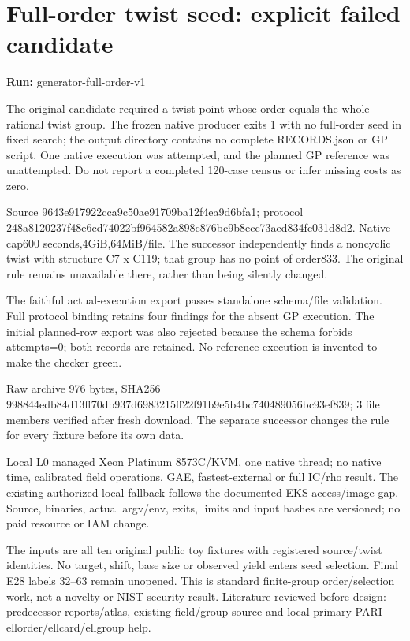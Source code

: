 \documentclass[10pt]{article}
\begin{document}
\section*{Full-order twist seed: explicit failed candidate}
\textbf{Run:} generator-full-order-v1\par
The original candidate required a twist point whose order equals the whole rational twist group. The frozen native producer exits 1 with no full-order seed in fixed search; the output directory contains no complete RECORDS.json or GP script. One native execution was attempted, and the planned GP reference was unattempted. Do not report a completed 120-case census or infer missing costs as zero.

Source 9643e917\allowbreak{}922cca9c\allowbreak{}50ae9170\allowbreak{}9ba12f4e\allowbreak{}a9d6bfa1; protocol 248a8120\allowbreak{}237f48e6\allowbreak{}cd74022b\allowbreak{}f964582a\allowbreak{}898c876b\allowbreak{}c9b8ecc7\allowbreak{}3aed834f\allowbreak{}c031d8d2. Native cap600 seconds,4GiB,64MiB/file. The successor independently finds a noncyclic twist with structure C7 x C119; that group has no point of order833. The original rule remains unavailable there, rather than being silently changed.

The faithful actual-execution export passes standalone schema/file validation. Full protocol binding retains four findings for the absent GP execution. The initial planned-row export was also rejected because the schema forbids attempts=0; both records are retained. No reference execution is invented to make the checker green.

Raw archive 976 bytes, SHA256 998844ed\allowbreak{}b84d13ff\allowbreak{}70db937d\allowbreak{}6983215f\allowbreak{}f22f91b9\allowbreak{}e5b4bc74\allowbreak{}0489056b\allowbreak{}c93ef839; 3 file members verified after fresh download. The separate successor changes the rule for every fixture before its own data.

Local L0 managed Xeon Platinum 8573C/KVM, one native thread; no native time, calibrated field operations, GAE, fastest-external or full IC/rho result. The existing authorized local fallback follows the documented EKS access/image gap. Source, binaries, actual argv/env, exits, limits and input hashes are versioned; no paid resource or IAM change.

The inputs are all ten original public toy fixtures with registered source/twist identities. No target, shift, base size or observed yield enters seed selection. Final E28 labels 32–63 remain unopened. This is standard finite-group order/selection work, not a novelty or NIST-security result. Literature reviewed before design: predecessor reports/atlas, existing field/group source and local primary PARI ellorder/ellcard/ellgroup help.
\end{document}
